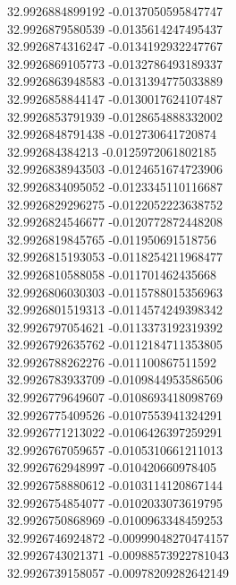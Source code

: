 {32.9926884899192	-0.0137050595847747\\
32.9926879580539	-0.0135614247495437\\
32.9926874316247	-0.0134192932247767\\
32.9926869105773	-0.0132786493189337\\
32.9926863948583	-0.0131394775033889\\
32.9926858844147	-0.0130017624107487\\
32.9926853791939	-0.0128654888332002\\
32.9926848791438	-0.012730641720874\\
32.992684384213	-0.0125972061802185\\
32.9926838943503	-0.0124651674723906\\
32.9926834095052	-0.0123345110116687\\
32.9926829296275	-0.0122052223638752\\
32.9926824546677	-0.0120772872448208\\
32.9926819845765	-0.011950691518756\\
32.9926815193053	-0.0118254211968477\\
32.9926810588058	-0.011701462435668\\
32.9926806030303	-0.0115788015356963\\
32.9926801519313	-0.0114574249398342\\
32.9926797054621	-0.0113373192319392\\
32.9926792635762	-0.0112184711353805\\
32.9926788262276	-0.011100867511592\\
32.9926783933709	-0.0109844953586506\\
32.9926779649607	-0.0108693418098769\\
32.9926775409526	-0.0107553941324291\\
32.9926771213022	-0.0106426397259291\\
32.9926767059657	-0.0105310661211013\\
32.9926762948997	-0.010420660978405\\
32.9926758880612	-0.0103114120867144\\
32.9926754854077	-0.0102033073619795\\
32.9926750868969	-0.0100963348459253\\
32.9926746924872	-0.00999048270474157\\
32.9926743021371	-0.00988573922781043\\
32.9926739158057	-0.00978209282642149\\
}
